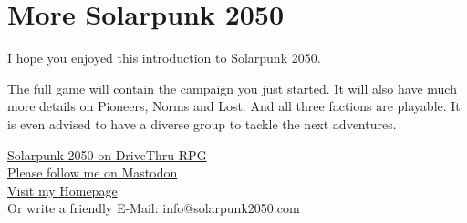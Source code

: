 \chapter{More Solarpunk 2050}

I hope you enjoyed this introduction to Solarpunk 2050.

The full game will contain the campaign you just started. It will also have much more details on Pioneers, Norms and Lost.
And all three factions are playable. It is even advised to have a diverse group to tackle the next adventures.

\vspace{1cm}
\begin{center}
\href{https://www.drivethrurpg.com/product/443881/Solarpunk-2050?affiliate_id=490747}{Solarpunk 2050 on DriveThru RPG} \\
\href{https://dice.camp/@solarpunk2050}{Please follow me on Mastodon} \\
\href{https://solarpunk2050.com}{Visit my Homepage} \\
Or write a friendly E-Mail: info@solarpunk2050.com \\
\end{center}